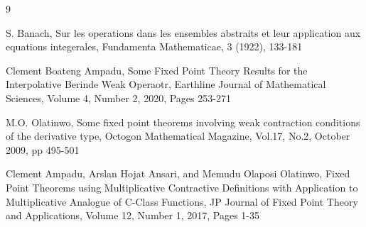 \documentclass[11pt,letterpaper]{article}
\begin{document}
\begin{thebibliography}{9}

S. Banach, Sur les operations dans les ensembles abstraits et leur application aux equations integerales, Fundamenta Mathematicae, 3  (1922),  133-181

Clement Boateng Ampadu, Some Fixed Point Theory Results for the Interpolative Berinde Weak Operaotr, Earthline Journal of Mathematical Sciences,  Volume 4, Number 2, 2020, Pages 253-271

M.O. Olatinwo, Some fixed point theorems involving weak contraction conditions of the derivative type, Octogon Mathematical Magazine,  Vol.17, No.2, October 2009,  pp 495-501

Clement Ampadu, Arslan Hojat Ansari, and Memudu Olaposi Olatinwo, Fixed Point Theorems using Multiplicative Contractive Definitions with Application to Multiplicative Analogue of C-Class Functions, JP Journal of Fixed Point Theory and Applications, Volume 12, Number 1, 2017,  Pages 1-35
\end{thebibliography}
\end{document}
